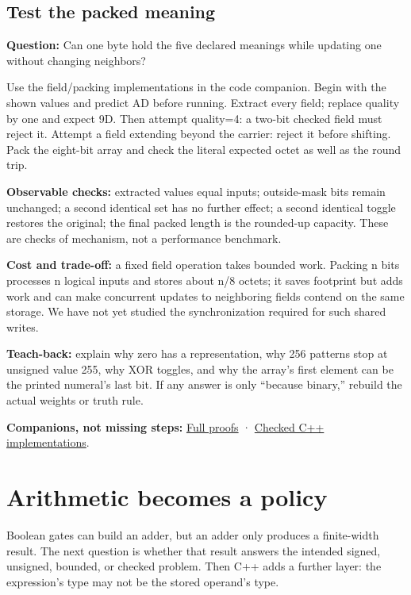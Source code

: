 \subsection{Test the packed meaning}\label{01-foundations-i-ch001-test-the-packed-meaning}

\textbf{Question:} Can one byte hold the five declared meanings while updating one without changing neighbors?

Use the field/packing implementations in the code companion. Begin with the shown values and predict AD before running. Extract every field; replace quality by one and expect 9D. Then attempt quality=4: a two-bit checked field must reject it. Attempt a field extending beyond the carrier: reject it before shifting. Pack the eight-bit array and check the literal expected octet as well as the round trip.

\textbf{Observable checks:} extracted values equal inputs; outside-mask bits remain unchanged; a second identical set has no further effect; a second identical toggle restores the original; the final packed length is the rounded-up capacity. These are checks of mechanism, not a performance benchmark.

\textbf{Cost and trade-off:} a fixed field operation takes bounded work. Packing n bits processes n logical inputs and stores about n/8 octets; it saves footprint but adds work and can make concurrent updates to neighboring fields contend on the same storage. We have not yet studied the synchronization required for such shared writes.

\textbf{Teach-back:} explain why zero has a representation, why 256 patterns stop at unsigned value 255, why XOR toggles, and why the array's first element can be the printed numeral's last bit. If any answer is only ``because binary,'' rebuild the actual weights or truth rule.

\textbf{Companions, not missing steps:} \hyperref[01-foundations-i-ch011-m001---positional-value-masks-fields-and-de-morgan]{Full proofs} · \hyperref[appendix-4e2236f53445-m001---width-safe-fields-and-lsb-first-bit-packing]{Checked C++ implementations}.

\section{Arithmetic becomes a policy}\label{01-foundations-i-ch001-arithmetic-becomes-a-policy}

Boolean gates can build an adder, but an adder only produces a finite-width result. The next question is whether that result answers the intended signed, unsigned, bounded, or checked problem. Then C++ adds a further layer: the expression's type may not be the stored operand's type.

